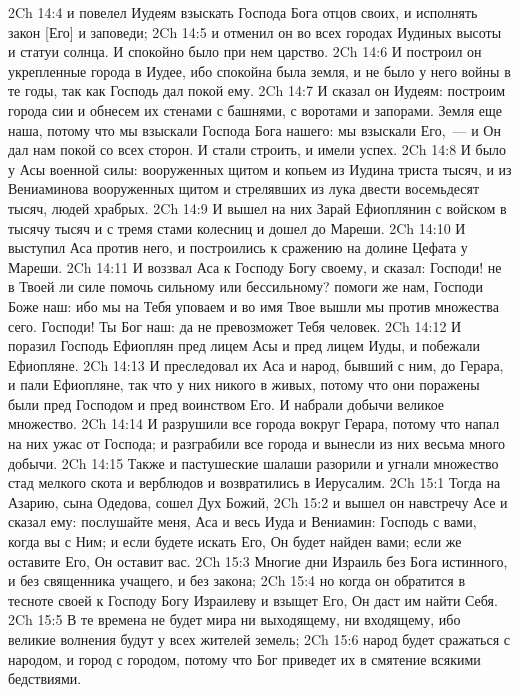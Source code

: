 \vs 2Ch 14:4 и повелел Иудеям взыскать Господа Бога отцов своих, и исполнять закон [Его] и заповеди;
\vs 2Ch 14:5 и отменил он во всех городах Иудиных высоты и статуи солнца. И спокойно было при нем царство.
\vs 2Ch 14:6 И построил он укрепленные города в Иудее, ибо спокойна была земля, и не было у него войны в те годы, так как Господь дал покой ему.
\vs 2Ch 14:7 И сказал он Иудеям: построим города сии и обнесем их стенами с башнями, с воротами и запорами. Земля еще наша, потому что мы взыскали Господа Бога нашего: мы взыскали Его,~--- и Он дал нам покой со всех сторон. И стали строить, и имели успех.
\vs 2Ch 14:8 И было у Асы военной силы: вооруженных щитом и копьем из  Иудина триста тысяч, и из  Вениаминова вооруженных щитом и стрелявших из лука двести восемьдесят тысяч, людей храбрых.
\rsbpar\vs 2Ch 14:9 И вышел на них Зарай Ефиоплянин с войском в тысячу тысяч и с тремя стами колесниц и дошел до Мареши.
\vs 2Ch 14:10 И выступил Аса против него, и построились к сражению на долине Цефата у Мареши.
\vs 2Ch 14:11 И воззвал Аса к Господу Богу своему, и сказал: Господи! не в Твоей ли силе помочь сильному или бессильному? помоги же нам, Господи Боже наш: ибо мы на Тебя уповаем и во имя Твое вышли мы против множества сего. Господи! Ты Бог наш: да не превозможет Тебя человек.
\vs 2Ch 14:12 И поразил Господь Ефиоплян пред лицем Асы и пред лицем Иуды, и побежали Ефиопляне.
\vs 2Ch 14:13 И преследовал их Аса и народ, бывший с ним, до Герара, и пали Ефиопляне, так что у них никого  в живых, потому что они поражены были пред Господом и пред воинством Его. И набрали добычи великое множество.
\vs 2Ch 14:14 И разрушили все города вокруг Герара, потому что напал на них ужас от Господа; и разграбили все города и вынесли из них весьма много добычи.
\vs 2Ch 14:15 Также и пастушеские шалаши разорили и угнали множество стад мелкого скота и верблюдов и возвратились в Иерусалим.
\vs 2Ch 15:1 Тогда на Азарию, сына Одедова, сошел Дух Божий,
\vs 2Ch 15:2 и вышел он навстречу Асе и сказал ему: послушайте меня, Аса и весь Иуда и Вениамин: Господь с вами, когда вы с Ним; и если будете искать Его, Он будет найден вами; если же оставите Его, Он оставит вас.
\vs 2Ch 15:3 Многие дни Израиль  без Бога истинного, и без священника учащего, и без закона;
\rsbpar\vs 2Ch 15:4 но когда он обратится в тесноте своей к Господу Богу Израилеву и взыщет Его, Он даст им найти Себя.
\vs 2Ch 15:5 В те времена не будет мира ни выходящему, ни входящему, ибо великие волнения будут у всех жителей земель;
\vs 2Ch 15:6 народ будет сражаться с народом, и город с городом, потому что Бог приведет их в смятение всякими бедствиями.
